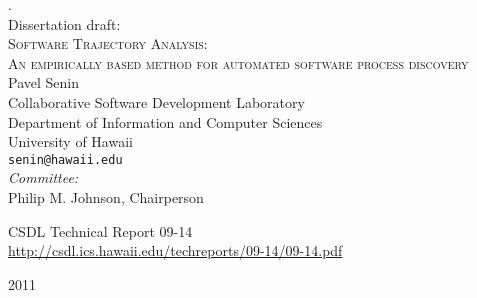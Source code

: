 \begin{titlepage}

\begin{center}

\tiny{.}\\ [1.2cm]

\Large{Dissertation draft:} \\ [0.5cm]
\LARGE{\textsc{Software Trajectory Analysis:}} \\
\LARGE{\textsc{An empirically based method for automated software process discovery}} \\ [0.6cm]

\large{
Pavel Senin \\
Collaborative Software Development Laboratory \\
Department of Information and Computer Sciences \\
University of Hawaii \\
\texttt{senin@hawaii.edu} \\ [1.0cm]


\emph{Committee:} \\
Philip M. Johnson, Chairperson \\
}

\normalsize{
CSDL Technical Report 09-14 \\
\url{http://csdl.ics.hawaii.edu/techreports/09-14/09-14.pdf} \\ [1.5cm]
}

\large{2011}

\end{center}

\end{titlepage}
